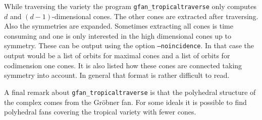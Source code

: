 
While traversing the variety the program
\texttt{gfan\_tropicaltraverse} only computes $d$ and
$(d-1)$-dimensional cones. The other cones are extracted after
traversing. Also the symmetries are expanded. Sometimes extracting all
cones is time consuming and one is only interested in the high
dimensional cones up to symmetry. These can be output using the option
\texttt{--noincidence}. In that case the output would be a list of
orbits for maximal cones and a list of orbits for codimension one
cones. It is also listed how these cones are connected taking symmetry
into account. In general that format is rather difficult to read.


A final remark about \texttt{gfan\_tropicaltraverse} is that the
polyhedral structure of the complex comes from the Gr\"obner fan. For
some ideals it is possible to find polyhedral fans covering the
tropical variety with fewer cones.


